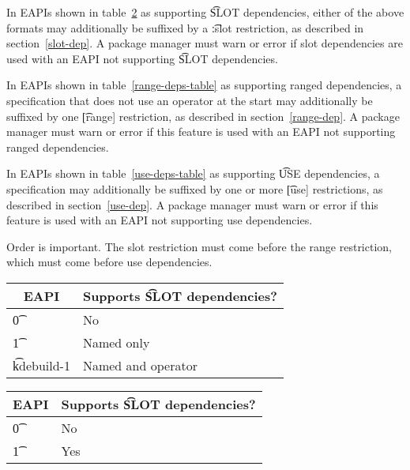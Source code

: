 In EAPIs shown in table~\ref{slot-deps-table} as supporting \t{SLOT} dependencies, either of the
above formats may additionally be suffixed by a \t{:slot} restriction, as described in
section~\ref{slot-dep}. A package manager must warn or error if slot dependencies are used with an
EAPI not supporting \t{SLOT} dependencies.

\IFKDEBUILDELSE
{
    In EAPIs shown in table~\ref{range-deps-table} as supporting ranged dependencies, a
    specification that does not use an operator at the start may additionally be suffixed by one
    \t{[range]} restriction, as described in section~\ref{range-dep}. A package manager must warn or
    error if this feature is used with an EAPI not supporting ranged dependencies.

    In EAPIs shown in table~\ref{use-deps-table} as supporting \t{USE} dependencies, a specification
    may additionally be suffixed by one or more \t{[use]} restrictions, as described in
    section~\ref{use-dep}. A package manager must warn or error if this feature is used with an EAPI
    not supporting use dependencies.

    \note Order is important. The slot restriction must come before the range restriction, which
    must come before use dependencies.
}{
}

\IFKDEBUILDELSE
{
    \begin{table}
    \centering
     \label{slot-deps-table}
    \begin{tabular}{ l l }
        \toprule
            \multicolumn{1}{c}{\textbf{EAPI}} &
            \multicolumn{1}{c}{\textbf{Supports \t{SLOT} dependencies?}} \\
            \midrule
    \t{0} & No \\
    \t{1} & Named only \\
    \t{kdebuild-1} & Named and operator \\
    \bottomrule
    \end{tabular}
    \end{table}
}{
    \begin{table}
    \centering
     \label{slot-deps-table}
    \begin{tabular}{ l l }
        \toprule
            \multicolumn{1}{c}{\textbf{EAPI}} &
            \multicolumn{1}{c}{\textbf{Supports \t{SLOT} dependencies?}} \\
            \midrule
    \t{0} & No \\
    \t{1} & Yes \\
    \bottomrule
    \end{tabular}
    \end{table}
}

